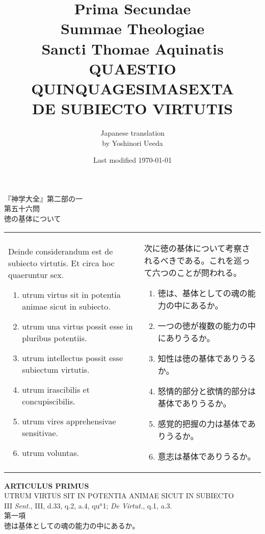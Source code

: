 \documentclass[10pt]{jsarticle}
\title{{\bf Prima Secundae}\\{\HUGE Summae Theologiae}\\Sancti Thomae
Aquinatis\\{\sffamily QUAESTIO QUINQUAGESIMASEXTA}\\{\bf DE SUBIECTO VIRTUTIS}}
\author{Japanese translation\\by Yoshinori {\sc Ueeda}}
\date{Last modified \today}
\begin{document}
\maketitle
\thispagestyle{empty}
\begin{center}
{\Large 『神学大全』第二部の一\\第五十六問\\徳の基体について}
\end{center}


\begin{longtable}{p{21em}p{21em}}
Deinde considerandum est de subiecto virtutis. Et circa hoc quaeruntur sex. 

\begin{enumerate}
 \item utrum virtus sit in potentia animae sicut in subiecto.
 \item utrum una virtus possit esse in pluribus potentiis.
 \item utrum intellectus possit esse subiectum virtutis.
 \item utrum irascibilis et concupiscibilis.
 \item utrum vires apprehensivae sensitivae.
 \item utrum voluntas.
\end{enumerate}

&

次に徳の基体について考察されるべきである。これを巡って六つのことが問われる。

\begin{enumerate}
 \item 徳は、基体としての魂の能力の中にあるか。
 \item 一つの徳が複数の能力の中にありうるか。
 \item 知性は徳の基体でありうるか。
 \item 怒情的部分と欲情的部分は基体でありうるか。
 \item 感覚的把握の力は基体でありうるか。
 \item 意志は基体でありうるか。
\end{enumerate}
\end{longtable}


\newpage
{}
\begin{center}
{\Large {\bf ARTICULUS PRIMUS}}\\
{\large UTRUM VIRTUS SIT IN POTENTIA ANIMAE SICUT IN SUBIECTO}\\
{\footnotesize III {\itshape Sent.}, III, d.33, q.2, a.4, qu$^{a}$1; {\itshape De Virtut.}, q.1, a.3.}\\
{\Large 第一項\\徳は基体としての魂の能力の中にあるか。}
\end{center}
\end{document}
